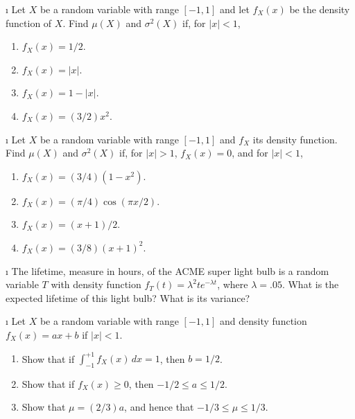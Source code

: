 {\exercises
\begin{LJSItem}

\i\label{exer 6.3.1} Let $X$ be a random variable with range $[-1,1]$ and let
$f_X(x)$ be the density function of $X$.  Find $\mu(X)$ and $\sigma^2(X)$ if, for $|x|
< 1$,

\begin{enumerate}
\item $f_X(x) = 1/2$.

\item $f_X(x) = |x|$.

\item $f_X(x) = 1 - |x|$.

\item $f_X(x) = (3/2) x^2$.
\end{enumerate}


\i\label{exer 6.3.3} Let $X$ be a random variable with range $[-1,1]$ and
$f_X$ its density function.  Find $\mu(X)$ and $\sigma^2(X)$ if, for $|x| > 1$,
$f_X(x) = 0$, and for $|x| < 1$,

\begin{enumerate}
\item $f_X(x) = (3/4)(1 - x^2)$.

\item $f_X(x) = (\pi/4)\cos(\pi x/2)$.

\item $f_X(x) = (x + 1)/2$.

\item $f_X(x) = (3/8)(x + 1)^2$.
\end{enumerate}

\i\label{exer 6.3.5} The lifetime, measure in hours, of the ACME super light bulb
is a random variable $T$ with density function $f_T(t) = \lambda^2 t e^{-\lambda t}$,
where
$\lambda = .05$.  What is the expected lifetime of this light bulb?  What is its
variance?

\i\label{exer 6.3.6} Let $X$ be a random variable with range $[-1,1]$ and density
function $f_X(x) = ax + b$ if $|x| < 1$.

\begin{enumerate}
\item Show that if $\int_{-1}^{+1} f_X(x)\, dx = 1$, then $b = 1/2$.

\item Show that if $f_X(x) \geq 0$, then $-1/2 \leq a \leq 1/2$.

\item Show that $\mu = (2/3)a$, and hence that $-1/3 \leq \mu \leq 1/3$.


\end{enumerate}
\end{LJSItem}}
